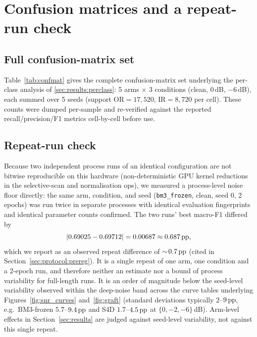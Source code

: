 \section{Confusion matrices and a repeat-run check}
\label{app:confusion}

\subsection{Full confusion-matrix set}
\label{app:confusion:matrices}

Table~\ref{tab:confmat} gives the complete confusion-matrix set underlying the per-class analysis of \ref{sec:results:perclass}: 5 arms $\times$ 3 conditions (clean, $0$\,dB, $-6$\,dB), each summed over 5 seeds (support OR$=17{,}520$, IR$=8{,}720$ per cell). These counts were dumped per-sample and re-verified against the reported recall/precision/F1 metrics cell-by-cell before use.



\subsection{Repeat-run check}
\label{app:confusion:floor}

Because two independent process runs of an identical configuration are not bitwise reproducible on this hardware (non-deterministic GPU kernel reductions in the selective-scan and normalisation ops), we measured a process-level noise floor directly: the same arm, condition, and seed (\texttt{bm3\_frozen}, clean, seed 0, 2 epochs) was run twice in separate processes with identical evaluation fingerprints and identical parameter counts confirmed. The two runs' best macro-F1 differed by
\[
|0.69025 - 0.69712| = 0.00687 \approx 0.687\,\mathrm{pp},
\]
which we report as an observed repeat difference of $\sim\!0.7\,\mathrm{pp}$ (cited in Section~\ref{sec:protocol:prereg}). It is a single repeat of one arm, one condition and a 2-epoch run, and therefore neither an estimate nor a bound of process variability for full-length runs. It is an order of magnitude below the seed-level variability observed within the deep-noise band across the curve tables underlying Figures~\ref{fig:snr_curves} and~\ref{fig:graft} (standard deviations typically $2$--$9\,\mathrm{pp}$, e.g.\ BM3-frozen $5.7$--$9.4\,\mathrm{pp}$ and S4D $1.7$--$4.5\,\mathrm{pp}$ at $\{0,-2,-6\}$\,dB). Arm-level effects in Section~\ref{sec:results} are judged against seed-level variability, not against this single repeat.
